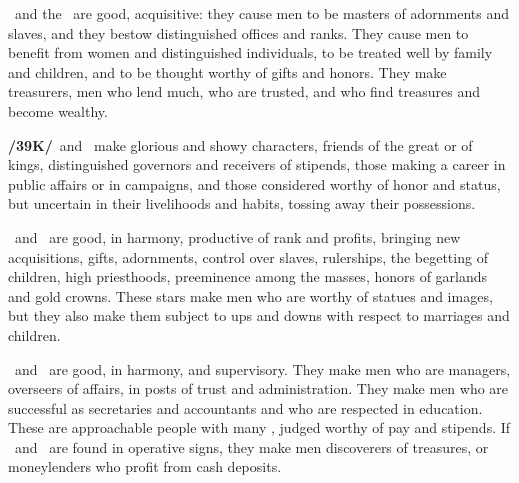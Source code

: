 \Jupiter\, and the \Moon\, are good, acquisitive: they cause men to be masters of adornments and slaves, and they bestow distinguished offices and ranks. They cause men to benefit from women and distinguished individuals, to be treated well by family and children, and to be thought worthy of gifts and honors. They make treasurers, men who lend much, who are trusted, and who find treasures and become wealthy.

\textbf{/39K/}\Jupiter\, and \Mars\, make glorious and showy characters, friends of the great or of kings, distinguished governors and receivers of stipends, those making a career in public affairs or in campaigns, and those considered worthy of honor and status, but uncertain in their livelihoods and habits, tossing away their possessions.

\Jupiter\, and \Venus\, are good, in harmony, productive of rank and profits, bringing new acquisitions, gifts, adornments, control over slaves, rulerships, the begetting of children, high priesthoods, preeminence among the masses, honors of garlands and gold crowns. These stars make men who are worthy of statues and images, but they also make them subject to ups and downs with respect to marriages and children.

\Jupiter\, and \Mercury\, are good, in harmony, and supervisory. They make men who are managers, overseers of affairs, in posts of trust and administration. They make men who are successful as secretaries and accountants and who are respected in education. These are approachable people with many , judged worthy of pay and stipends. If \Jupiter\, and \Mercury\, are found in operative signs, they make men discoverers of treasures, or moneylenders who profit from cash deposits.

